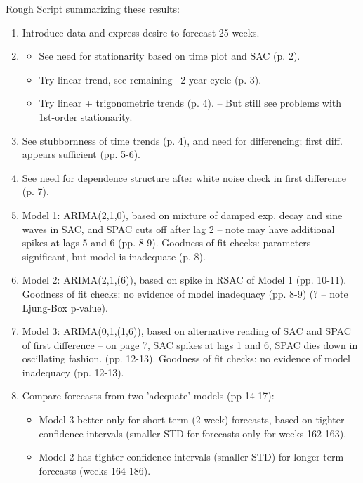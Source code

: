 \documentclass{article}\usepackage[]{graphicx}\usepackage[]{color}
\begin{document}
Rough Script summarizing these results:

\begin{enumerate}
\item Introduce data and express desire to forecast 25 weeks. \\
\item 
\begin{itemize} 
\item See need for stationarity based on time plot and 
   SAC (p. 2). \\
\item Try linear trend, see remaining ~2 year cycle (p. 3). \\
\item Try linear + trigonometric trends (p. 4). 
   -- But still see problems with 1st-order stationarity. 
\end{itemize} 
\item See stubbornness of time trends (p. 4), and need for 
   differencing; first diff. appears sufficient (pp. 5-6). \\
\item See need for dependence structure after white noise 
   check in first difference (p. 7). \\
\item Model 1: ARIMA(2,1,0), based on mixture of damped 
   exp. decay and sine waves in SAC, and SPAC cuts off 
   after lag 2 -- note may have additional spikes at lags 5 
   and 6 (pp. 8-9). 
   Goodness of fit checks: parameters significant, but 
   model is inadequate (p. 8). \\
\item Model 2: ARIMA(2,1,(6)), based on spike in RSAC of 
   Model 1 (pp. 10-11).
   Goodness of fit checks: no evidence of model 
   inadequacy (pp. 8-9) (? -- note Ljung-Box p-value). \\
\item Model 3: ARIMA(0,1,(1,6)), based on alternative reading 
   of SAC and SPAC of first difference -- on page 7, SAC 
   spikes at lags 1 and 6, SPAC dies down in oscillating 
   fashion.  (pp. 12-13).
   Goodness of fit checks: no evidence of model inadequacy 
   (pp. 12-13). \\
\item Compare forecasts from two 'adequate' models (pp 14-17): 
\begin{itemize}
\item Model 3 better only for short-term (2 week) forecasts, 
     based on tighter confidence intervals (smaller STD for 
     forecasts only for weeks 162-163).
\item Model 2 has tighter confidence intervals (smaller STD)
     for longer-term forecasts (weeks 164-186). 
\end{itemize}
\end{enumerate}
\end{document}
